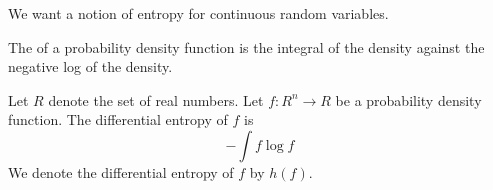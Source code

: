 
\sbasic




























\sstart
{}


We want a notion of entropy
for continuous random variables.


The 
of a probability density function
is the integral of the density
against the negative log
of the density.


Let $R$ denote the set of
real numbers.
Let $f: R^n \to R$ be
a probability density function.
The differential entropy of $f$
is
\[
  - \int f \log f
\]
We denote the differential entropy
of $f$ by $h(f)$.
\strats
